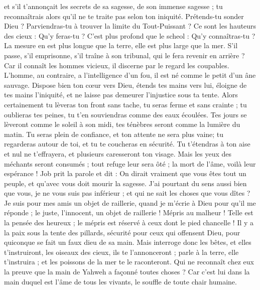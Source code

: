 \begin{multicols}{2}
et s'il t'annonçait les secrets de sa sagesse, de son immense sagesse ; tu reconnaîtrais alors qu'il ne te traite pas selon ton iniquité.
Prétends-tu sonder Dieu ? Parviendras-tu à trouver la limite du Tout-Puissant ?
Ce sont les hauteurs des cieux : Qu'y feras-tu ? C'est plus profond que le scheol : Qu'y connaîtras-tu ?
La mesure en est plus longue que la terre, elle est plus large que la mer.
S'il passe, s'il emprisonne, s'il traîne à son tribunal, qui le fera revenir en arrière ?
Car il connaît les hommes vicieux, il discerne par le regard les coupables.
L'homme, au contraire, a l'intelligence d'un fou, il est né comme le petit d'un âne sauvage.
Dispose bien ton cœur vers Dieu, étends tes mains vers lui,
éloigne de tes mains l'iniquité, et ne laisse pas demeurer l'injustice sous ta tente.
Alors certainement tu lèveras ton front sans tache, tu seras ferme et sans crainte ;
tu oublieras tes peines, tu t'en souviendras comme des eaux écoulées.
Tes jours se lèveront comme le soleil à son midi, tes ténèbres seront comme la lumière du matin.
Tu seras plein de confiance, et ton attente ne sera plus vaine; tu regarderas autour de toi, et tu te coucheras en sécurité.
Tu t'étendras à ton aise et nul ne t'effrayera, et plusieurs caresseront ton visage.
Mais les yeux des méchants seront consumés ; tout refuge leur sera ôté ; la mort de l'âme, voilà leur espérance !
\VerseOne{}Job prit la parole et dit :
On dirait vraiment que vous êtes tout un peuple, et qu'avec vous doit mourir la sagesse.
J'ai pourtant du sens aussi bien que vous, je ne vous suis pas inférieur ; et qui ne sait les choses que vous dîtes ?
Je suis pour mes amis un objet de raillerie, quand je m'écrie à Dieu pour qu'il me réponde ; le juste, l'innocent, un objet de raillerie !
Mépris au malheur ! Telle est la pensée des heureux ; le mépris est réservé à ceux dont le pied chancelle !
Il y a la paix sous la tente des pillards, sécurité pour ceux qui offensent Dieu, pour quiconque se fait un faux dieu de sa main.
Mais interroge donc les bêtes, et elles t'instruiront, les oiseaux des cieux, ils te l'annonceront ;
parle à la terre, elle t'instruira ; et les poissons de la mer te le raconteront.
Qui ne reconnaît chez eux la preuve que la main de Yahweh a façonné toutes choses ?
Car c'est lui dans la main duquel est l'âme de tous les vivants, le souffle de toute chair humaine.

\end{multicols}
